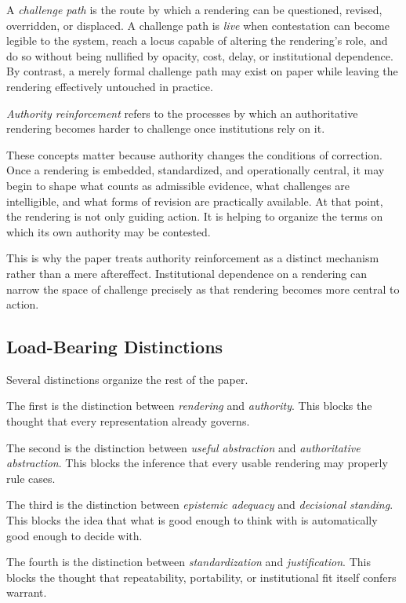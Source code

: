 \documentclass[11pt]{article}
\renewcommand{\emph}[1]{\textit{#1}}
\begin{document}
A \emph{challenge path} is the route by which a rendering can be questioned, revised, overridden, or displaced. A challenge path is \emph{live} when contestation can become legible to the system, reach a locus capable of altering the rendering's role, and do so without being nullified by opacity, cost, delay, or institutional dependence. By contrast, a merely formal challenge path may exist on paper while leaving the rendering effectively untouched in practice.\cite{Swanson2026MediatedJudgmentConstraint,MoynihanHerdHarvey2015AdministrativeBurden}

\emph{Authority reinforcement} refers to the processes by which an authoritative rendering becomes harder to challenge once institutions rely on it.

These concepts matter because authority changes the conditions of correction. Once a rendering is embedded, standardized, and operationally central, it may begin to shape what counts as admissible evidence, what challenges are intelligible, and what forms of revision are practically available. At that point, the rendering is not only guiding action. It is helping to organize the terms on which its own authority may be contested.\cite{Power1997AuditSociety,Swanson2026MediatedJudgmentConstraint}

This is why the paper treats authority reinforcement as a distinct mechanism rather than a mere aftereffect. Institutional dependence on a rendering can narrow the space of challenge precisely as that rendering becomes more central to action.

\subsection{Load-Bearing Distinctions}

Several distinctions organize the rest of the paper.

The first is the distinction between \emph{rendering} and \emph{authority}. This blocks the thought that every representation already governs.

The second is the distinction between \emph{useful abstraction} and \emph{authoritative abstraction}. This blocks the inference that every usable rendering may properly rule cases.

The third is the distinction between \emph{epistemic adequacy} and \emph{decisional standing}. This blocks the idea that what is good enough to think with is automatically good enough to decide with.

The fourth is the distinction between \emph{standardization} and \emph{justification}. This blocks the thought that repeatability, portability, or institutional fit itself confers warrant.
\end{document}
